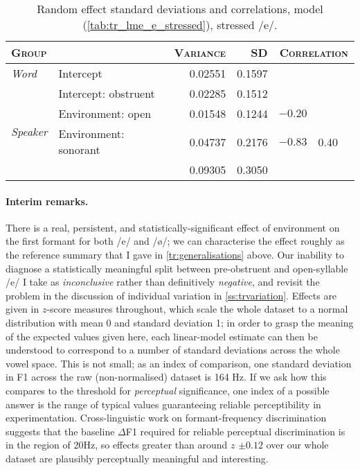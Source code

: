 \begin{table}[H]
  \centering
  \begin{tabular}{llrrrrr}
    \toprule
    \textsc{Group} & \textsc{} & \textsc{Variance} & \textsc{SD} & \multicolumn{3}{c}{\textsc{Correlation}}\\
    \midrule
    \multirow{1}{*}{\textit{Word}} & Intercept & 0.02551 & 0.1597 & & &  \\
    \midrule
    \multirow{4}{*}{\textit{Speaker}} & Intercept: obstruent & 0.02285 &  0.1512  \\
                & Environment: open                        & 0.01548 & 0.1244  & $-0.20$   \\
                & Environment: sonorant                    &0.04737 &  0.2176 & $ -0.83$ & 0.40    \\
    \midrule
    \textit{Residual} & & 0.09305 & 0.3050 \\
    \bottomrule
  \end{tabular}
  \caption[, /e/]{Random effect standard deviations and correlations, model  (\cref{tab:tr_lme_e_stressed}), stressed /e/.}
  \label{tab:tr_lme_e_stressed_random}
\end{table}

\paragraph{Interim remarks.} There is a real, persistent, and statistically-significant effect of environment on the first formant for both /e/ and /ø/; we can characterise the effect roughly as the reference summary that I gave in \cref{tr:generalisations} above. Our inability to diagnose a statistically meaningful split between pre-obstruent and open-syllable /e/ I take as \emph{inconclusive} rather than definitively \emph{negative}, and revisit the problem in the discussion of individual variation in \cref{ss:trvariation}. Effects are given in $z$-score measures throughout, which scale the whole dataset to a normal distribution with mean 0 and standard deviation 1; in order to grasp the meaning of the expected values given here, each linear-model estimate can then be understood to correspond to a number of standard deviations across the whole vowel space. This is not small; as an index of comparison, one standard deviation in F1 across the {raw} (non-normalised) dataset is 164 Hz. If we ask how this compares to the threshold for \emph{perceptual} significance, one index of a possible answer is the range of typical values guaranteeing reliable perceptibility in experimentation. Cross-linguistic work on formant-frequency discrimination \citep{KewleyPort1994,KewleyPort2005} suggests that the baseline $\Delta$F1 required for reliable perceptual discrimination is in the region of 20Hz, so effects greater than around $z$ $\pm 0.12$ over our whole dataset are plausibly perceptually meaningful and interesting.

